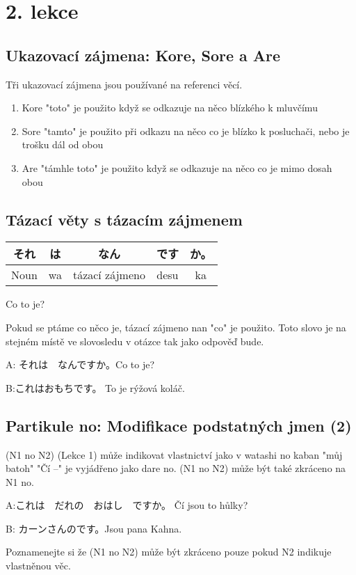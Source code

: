 \section{2. lekce}
\label{sec:lekce_2}

\subsection{Ukazovací zájmena: Kore, Sore a Are}
Tři ukazovací zájmena jsou používané na referenci věcí.
\begin{enumerate}
\item Kore "toto" je použito když se odkazuje na něco blízkého k mluvčímu
\item Sore "tamto" je použito při odkazu na něco co je blízko k posluchači, nebo je trošku dál od obou
\item Are "támhle toto" je použito když se odkazuje na něco co je mimo dosah obou
\end{enumerate}

\subsection{Tázací věty s tázacím zájmenem}
\begin{center}
\begin{tabular}{||c|c||c|c|c||}
\hline
それ&は&なん&です&か。\\
\hline
Noun&wa&tázací zájmeno&desu&ka\\
\hline
\end{tabular}
\end{center}
Co to je?

Pokud se ptáme co něco je, tázací zájmeno nan "co" je použito. Toto slovo je na stejném místě ve slovosledu v otázce tak jako odpověď bude.

A: それは　なんですか。Co to je?

B:これはおもちです。 To je rýžová koláč.


\subsection{Partikule no: Modifikace podstatných jmen (2)}

(N1 no N2) (Lekce 1) může indikovat vlastnictví jako v watashi no kaban "můj batoh" "Čí --" je vyjádřeno jako dare no. (N1 no N2) může být také zkráceno na N1 no. 

A:これは　だれの　おはし　ですか。 Čí jsou to hůlky?

B: カーンさんのです。Jsou pana Kahna.

Poznamenejte si že (N1 no N2) může být zkráceno pouze pokud N2 indikuje vlastněnou věc.




